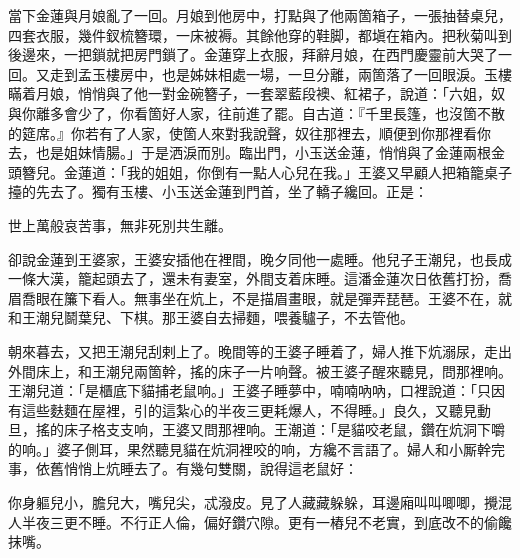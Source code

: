 當下金蓮與月娘亂了一回。月娘到他房中，打點與了他兩箇箱子，一張抽替桌兒，四套衣服，幾件釵梳簪環，一床被褥。其餘他穿的鞋脚，都塡在箱內。把秋菊叫到後邊來，一把鎖就把房門鎖了。{}金蓮穿上衣服，拜辭月娘，在西門慶靈前大哭了一回。{}又走到孟玉樓房中，也是姊妹相處一場，一旦分離，兩箇落了一回眼淚。玉樓瞞着月娘，悄悄與了他一對金碗簪子，一套翠藍段襖、紅裙子，說道：「六姐，奴與你離多會少了，你看箇好人家，往前進了罷。自古道：『千里長篷，也沒箇不散的筵席。』你若有了人家，使箇人來對我說聲，奴往那裡去，順便到你那裡看你去，也是姐妹情腸。」{}于是洒淚而別。臨出門，小玉送金蓮，悄悄與了金蓮兩根金頭簪兒。金蓮道：「我的姐姐，你倒有一點人心兒在我。」王婆又早顧人把箱籠桌子擡的先去了。獨有玉樓、小玉送金蓮到門首，坐了轎子纔回。正是：

\begin{myquote}
世上萬般哀苦事，無非死別共生離。
\end{myquote}

卻說金蓮到王婆家，王婆安插他在裡間，晚夕同他一處睡。他兒子王潮兒，也長成一條大漢，籠起頭去了，還未有妻室，外間支着床睡。這潘金蓮次日依舊打扮，喬眉喬眼在簾下看人。無事坐在炕上，不是描眉畫眼，就是彈弄琵琶。王婆不在，就和王潮兒鬬葉兒、下棋。那王婆自去掃麵，喂養驢子，不去管他。

朝來暮去，又把王潮兒刮剌上了。晚間等的王婆子睡着了，婦人推下炕溺尿，走出外間床上，和王潮兒兩箇幹，搖的床子一片响聲。{}被王婆子醒來聽見，問那裡响。王潮兒道：「是櫃底下貓捕老鼠响。」王婆子睡夢中，喃喃吶吶，口裡說道：「只因有這些麩麵在屋裡，引的這紮心的半夜三更耗爆人，不得睡。」良久，又聽見動旦，搖的床子格支支响，王婆又問那裡响。王潮道：「是貓咬老鼠，鑽在炕洞下嚼的响。」{}婆子側耳，果然聽見貓在炕洞裡咬的响，方纔不言語了。婦人和小厮幹完事，依舊悄悄上炕睡去了。有幾句雙關，說得這老鼠好：

\begin{myquote}
你身軀兒小，膽兒大，嘴兒尖，忒潑皮。見了人藏藏躲躲，耳邊廂叫叫唧唧，攪混人半夜三更不睡。不行正人倫，偏好鑽穴隙。更有一樁兒不老實，到底改不的偷饞抹嘴。
\end{myquote}


